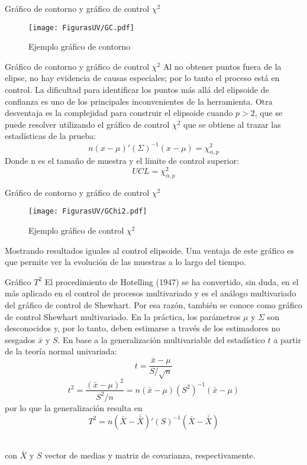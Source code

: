\documentclass[10pt]{beamer}
\begin{document}
\begin{frame}{Gráfico de contorno y gráfico de control $\chi^2$}
\begin{figure}[h!]
  \centering
  \texttt{[image: FigurasUV/GC.pdf]}
  \caption{Ejemplo gráfico de contorno}
\end{figure}
\end{frame}

\begin{frame}{Gráfico de contorno y gráfico de control $\chi^2$}
Al no obtener puntos fuera de la elipse, no hay evidencia de causas especiales; por lo tanto el proceso está en control. La dificultad para identificar los puntos más allá del elipsoide de confianza es uno de los principales inconvenientes de la herramienta. Otra desventaja es la complejidad para construir el elipsoide cuando $p> 2$, que se puede resolver utilizando el gráfico de control $\chi^2$ que se obtiene al trazar las estadísticas de la prueba:
$$n(x-\mu)'(\Sigma)^{-1}(x-\mu)= \chi^2_{\alpha,p}$$
Donde n es el tamaño de muestra y el límite de control superior:
$$UCL=\chi^2_{\alpha,p}$$
\end{frame}

\begin{frame}{Gráfico de contorno y gráfico de control $\chi^2$}
\begin{figure}[h!]
  \centering
  \texttt{[image: FigurasUV/GChi2.pdf]}
  \caption{Ejemplo gráfico de control $\chi^2$}
\end{figure}

Mostrando resultados iguales al control elipsoide. Una ventaja de este gráfico es que permite ver la evolución de las muestras a lo largo del tiempo.
\end{frame}

\begin{frame}{Gráfico $T^2$}
El procedimiento de Hotelling (1947) se ha convertido, sin duda, en el más aplicado en el control de procesos multivariado y es el análogo multivariado del gráfico de control de Shewhart. Por esa razón, también se conoce como gráfico de control Shewhart multivariado. En la práctica, los parámetros $\mu$ y $\Sigma$ son desconocidos y, por lo tanto, deben estimarse a través de los estimadores no sesgados $\bar{x}$ y $S$. En base a la generalización multivariable del estadístico $t$ a partir de la teoría normal univariada:
$$t=\frac{\bar{x}-\mu}{S/\sqrt{n}}$$
$$t^2=\frac{(\bar{x}-\mu)^2}{S^2/n}=n(\bar{x}-\mu)(S^2)^{-1}(\bar{x}-\mu)$$
por lo que la generalización resulta en
$$T^2=n(\bar{X}-\bar{\bar{X}})'(S)^{-1}(\bar{X}-\bar{\bar{X}})$$

~\\con $\bar{X}$ y $S$ vector de medias y matriz de covarianza, respectivamente.
\end{frame}
\end{document}
